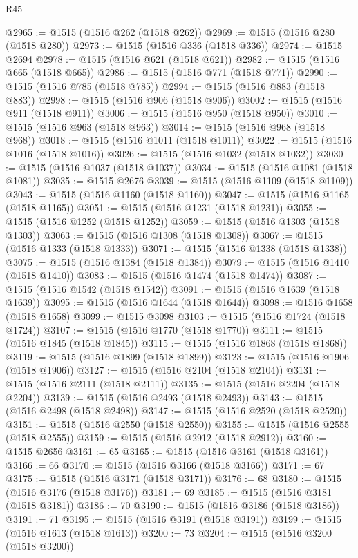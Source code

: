 \begin{lexlean}{R45}
\begin{coremodule}
{@2965 := @1515 (@1516 @262 (@1518 @262))
@2969 := @1515 (@1516 @280 (@1518 @280))
@2973 := @1515 (@1516 @336 (@1518 @336))
@2974 := @1515 @2694
@2978 := @1515 (@1516 @621 (@1518 @621))
@2982 := @1515 (@1516 @665 (@1518 @665))
@2986 := @1515 (@1516 @771 (@1518 @771))
@2990 := @1515 (@1516 @785 (@1518 @785))
@2994 := @1515 (@1516 @883 (@1518 @883))
@2998 := @1515 (@1516 @906 (@1518 @906))
@3002 := @1515 (@1516 @911 (@1518 @911))
@3006 := @1515 (@1516 @950 (@1518 @950))
@3010 := @1515 (@1516 @963 (@1518 @963))
@3014 := @1515 (@1516 @968 (@1518 @968))
@3018 := @1515 (@1516 @1011 (@1518 @1011))
@3022 := @1515 (@1516 @1016 (@1518 @1016))
@3026 := @1515 (@1516 @1032 (@1518 @1032))
@3030 := @1515 (@1516 @1037 (@1518 @1037))
@3034 := @1515 (@1516 @1081 (@1518 @1081))
@3035 := @1515 @2676
@3039 := @1515 (@1516 @1109 (@1518 @1109))
@3043 := @1515 (@1516 @1160 (@1518 @1160))
@3047 := @1515 (@1516 @1165 (@1518 @1165))
@3051 := @1515 (@1516 @1231 (@1518 @1231))
@3055 := @1515 (@1516 @1252 (@1518 @1252))
@3059 := @1515 (@1516 @1303 (@1518 @1303))
@3063 := @1515 (@1516 @1308 (@1518 @1308))
@3067 := @1515 (@1516 @1333 (@1518 @1333))
@3071 := @1515 (@1516 @1338 (@1518 @1338))
@3075 := @1515 (@1516 @1384 (@1518 @1384))
@3079 := @1515 (@1516 @1410 (@1518 @1410))
@3083 := @1515 (@1516 @1474 (@1518 @1474))
@3087 := @1515 (@1516 @1542 (@1518 @1542))
@3091 := @1515 (@1516 @1639 (@1518 @1639))
@3095 := @1515 (@1516 @1644 (@1518 @1644))
@3098 := @1516 @1658 (@1518 @1658)
@3099 := @1515 @3098
@3103 := @1515 (@1516 @1724 (@1518 @1724))
@3107 := @1515 (@1516 @1770 (@1518 @1770))
@3111 := @1515 (@1516 @1845 (@1518 @1845))
@3115 := @1515 (@1516 @1868 (@1518 @1868))
@3119 := @1515 (@1516 @1899 (@1518 @1899))
@3123 := @1515 (@1516 @1906 (@1518 @1906))
@3127 := @1515 (@1516 @2104 (@1518 @2104))
@3131 := @1515 (@1516 @2111 (@1518 @2111))
@3135 := @1515 (@1516 @2204 (@1518 @2204))
@3139 := @1515 (@1516 @2493 (@1518 @2493))
@3143 := @1515 (@1516 @2498 (@1518 @2498))
@3147 := @1515 (@1516 @2520 (@1518 @2520))
@3151 := @1515 (@1516 @2550 (@1518 @2550))
@3155 := @1515 (@1516 @2555 (@1518 @2555))
@3159 := @1515 (@1516 @2912 (@1518 @2912))
@3160 := @1515 @2656
@3161 := 65
@3165 := @1515 (@1516 @3161 (@1518 @3161))
@3166 := 66
@3170 := @1515 (@1516 @3166 (@1518 @3166))
@3171 := 67
@3175 := @1515 (@1516 @3171 (@1518 @3171))
@3176 := 68
@3180 := @1515 (@1516 @3176 (@1518 @3176))
@3181 := 69
@3185 := @1515 (@1516 @3181 (@1518 @3181))
@3186 := 70
@3190 := @1515 (@1516 @3186 (@1518 @3186))
@3191 := 71
@3195 := @1515 (@1516 @3191 (@1518 @3191))
@3199 := @1515 (@1516 @1613 (@1518 @1613))
@3200 := 73
@3204 := @1515 (@1516 @3200 (@1518 @3200))
}
\end{coremodule}
\end{lexlean}
